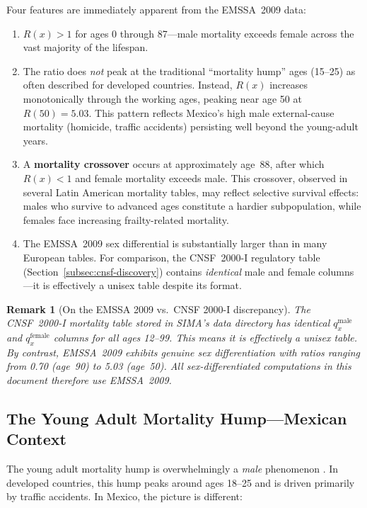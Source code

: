 \documentclass[12pt,a4paper]{article}
\newtheorem{remark}[definition]{Remark}
\newcommand{\qx}[1]{q_{#1}}
\begin{document}
Four features are immediately apparent from the EMSSA~2009 data:
\begin{enumerate}
  \item $R(x) > 1$ for ages 0 through 87---male mortality exceeds female
        across the vast majority of the lifespan.
  \item The ratio does \emph{not} peak at the traditional ``mortality hump''
        ages (15--25) as often described for developed countries. Instead,
        $R(x)$ increases monotonically through the working ages, peaking near
        age 50 at $R(50) = 5.03$. This pattern reflects Mexico's high
        male external-cause mortality (homicide, traffic accidents) persisting
        well beyond the young-adult years.
  \item A \textbf{mortality crossover} occurs at approximately age~88, after
        which $R(x) < 1$ and female mortality exceeds male. This crossover,
        observed in several Latin American mortality tables, may reflect
        selective survival effects: males who survive to advanced ages
        constitute a hardier subpopulation, while females face increasing
        frailty-related mortality.
  \item The EMSSA~2009 sex differential is substantially larger than in many
        European tables. For comparison, the CNSF~2000-I regulatory table
        (Section~\ref{subsec:cnsf-discovery}) contains \emph{identical} male
        and female columns---it is effectively a unisex table despite its format.
\end{enumerate}

\begin{remark}[On the EMSSA 2009 vs.\ CNSF 2000-I discrepancy]
\label{rem:cnsf-identical}
The CNSF~2000-I mortality table stored in SIMA's data directory has identical
$\qx{x}^{\text{male}}$ and $\qx{x}^{\text{female}}$ columns for all ages 12--99.
This means it is effectively a unisex table. By contrast, EMSSA~2009 exhibits
genuine sex differentiation with ratios ranging from 0.70 (age~90) to 5.03
(age~50). All sex-differentiated computations in this document therefore use
EMSSA~2009.
\end{remark}

\subsection{The Young Adult Mortality Hump---Mexican Context}
\label{subsec:hump}

The young adult mortality hump is overwhelmingly a \emph{male} phenomenon
\cite{remund2018}. In developed countries, this hump peaks around ages 18--25
and is driven primarily by traffic accidents. In Mexico, the picture is different:
\end{document}
